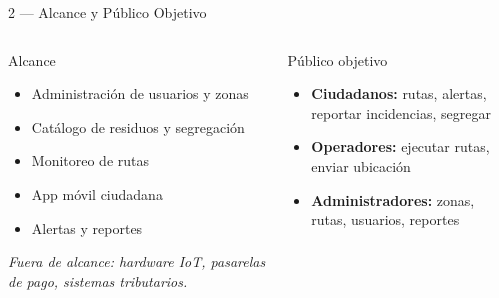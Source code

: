 \documentclass[aspectratio=169, 11pt]{beamer}
\begin{document}
\begin{frame}{2 — Alcance y Público Objetivo}
    \vspace{-0.3cm}
    \begin{columns}[T]
    \begin{block}{Alcance}
        \footnotesize
        \begin{itemize}
            \item Administración de usuarios y zonas
            \item Catálogo de residuos y segregación
            \item Monitoreo de rutas
            \item App móvil ciudadana
            \item Alertas y reportes
        \end{itemize}
        \textit{\scriptsize Fuera de alcance: hardware IoT, pasarelas de pago, sistemas tributarios.}
    \end{block}

    \begin{block}{Público objetivo}
        \footnotesize
        \begin{itemize}
            \item \textbf{Ciudadanos:} rutas, alertas, reportar incidencias, segregar
            \item \textbf{Operadores:} ejecutar rutas, enviar ubicación
            \item \textbf{Administradores:} zonas, rutas, usuarios, reportes
        \end{itemize}
    \end{block}
    \end{columns}
\end{frame}
\end{document}
